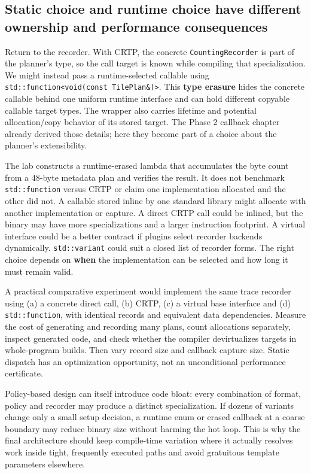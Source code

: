 \subsection{Static choice and runtime choice have different ownership and performance consequences}\label{05-engine-i-ch005-static-choice-and-runtime-choice-have-different-ownership-and-performance-consequences}

Return to the recorder. With CRTP, the concrete \texttt{CountingRecorder} is part of the planner's type, so the call target is known while compiling that specialization. We might instead pass a runtime-selected callable using \texttt{std::function\textless{}void(const\ TilePlan\&)\textgreater{}}. This \textbf{type erasure} hides the concrete callable behind one uniform runtime interface and can hold different copyable callable target types. The wrapper also carries lifetime and potential allocation/copy behavior of its stored target. The Phase 2 callback chapter already derived those details; here they become part of a choice about the planner's extensibility.

The lab constructs a runtime-erased lambda that accumulates the byte count from a 48-byte metadata plan and verifies the result. It does not benchmark \texttt{std::function} versus CRTP or claim one implementation allocated and the other did not. A callable stored inline by one standard library might allocate with another implementation or capture. A direct CRTP call could be inlined, but the binary may have more specializations and a larger instruction footprint. A virtual interface could be a better contract if plugins select recorder backends dynamically. \texttt{std::variant} could suit a closed list of recorder forms. The right choice depends on \textbf{when} the implementation can be selected and how long it must remain valid.

A practical comparative experiment would implement the same trace recorder using (a) a concrete direct call, (b) CRTP, (c) a virtual base interface and (d) \texttt{std::function}, with identical records and equivalent data dependencies. Measure the cost of generating and recording many plans, count allocations separately, inspect generated code, and check whether the compiler devirtualizes targets in whole-program builds. Then vary record size and callback capture size. Static dispatch has an optimization opportunity, not an unconditional performance certificate.

Policy-based design can itself introduce code bloat: every combination of format, policy and recorder may produce a distinct specialization. If dozens of variants change only a small setup decision, a runtime enum or erased callback at a coarse boundary may reduce binary size without harming the hot loop. This is why the final architecture should keep compile-time variation where it actually resolves work inside tight, frequently executed paths and avoid gratuitous template parameters elsewhere.

